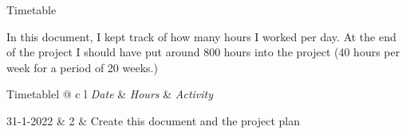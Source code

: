 \documentclass{matthijs}
\begin{document}

	\begin{titelpagina}


	\end{titelpagina}

	\begin{hoofdstuk}{Timetable}

		In this document, I kept track of how many hours I worked per day.
		At the end of the project I should have put around 800 hours into the project (40 hours per week for a period of 20 weeks.)

		\begin{tabel}{Timetable}{l @{\extracolsep{\fill}} c l}
			\emph{Date} & \emph{Hours} & \emph{Activity} \\
			\midrule

			31-1-2022 & 2 & Create this document and the project plan \tabularnewline
		\end{tabel}

	\end{hoofdstuk}
\end{document}

